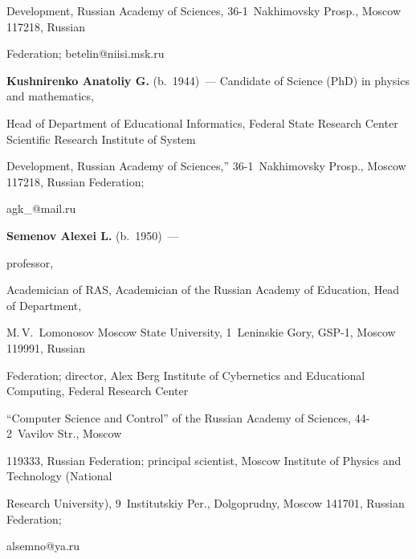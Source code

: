 Development, Russian Academy of Sciences, 36-1~Nakhimovsky Prosp., Moscow 117218, Russian 


Federation; \mbox{betelin@niisi.msk.ru}





\vspace*{3pt}





\noindent


\textbf{Kushnirenko Anatoliy G.} (b.\ 1944)~--- Candidate of Science (PhD) in physics and mathematics, 


Head of Department of Educational Informatics, Federal State Research Center Scientific Research Institute of System 


Development, Russian Academy of Sciences,'' 36-1~Nakhimovsky Prosp., Moscow 117218, Russian Federation; 


\mbox{agk\_@mail.ru}





\vspace*{3pt}





\noindent


\textbf{Semenov Alexei L.} (b.\ 1950)~--- %


professor, 


Academician of RAS, Academician of the Russian Academy of Education, Head of Department, 


M.\,V.~Lomonosov Moscow State University, 1~Leninskie Gory, GSP-1, Moscow 119991, Russian 


Federation; director, Alex Berg Institute of Cybernetics and Educational Computing, Federal Research Center 


``Computer Science and Control'' of the Russian Academy of Sciences, 44-2~Vavilov Str., Moscow 


119333, Russian Federation; principal scientist, Moscow Institute of Physics and Technology (National 


Research University), 9~Institutskiy Per., Dolgoprudny, Moscow 141701, Russian Federation; 


\mbox{alsemno@ya.ru}





\vspace*{3pt}





